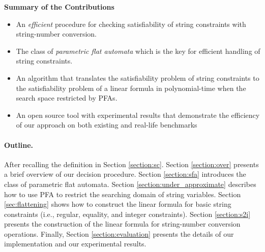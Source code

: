 \documentclass[sigplan,review,anonymous]{acmart}\settopmatter{printfolios=true,printccs=false,printacmref=false}
\begin{document}
\smallskip

\noindent
{\bf Summary of the Contributions}

\begin{itemize}

\item An {\em efficient} procedure for checking satisfiability
of string constraints with string-number conversion.



\item The class of \emph{parametric flat automata} which is the key for efficient handling of string constraints.

\item An algorithm that translates the satisfiability problem of string constraints to the satisfiability problem of a linear formula  in polynomial-time when  the search space restricted by PFAs.


\item An open source tool with experimental
results that demonstrate the efficiency of
our approach on both existing and real-life benchmarks
\end{itemize}


\paragraph{Outline.}
After recalling the  definition in Section \ref{section:sc}. Section \ref{section:over} presents a brief overview of our decision procedure. 
Section \ref{section:sfa} introduces  the class of parametric flat automata. 
Section \ref{section:under_approximate} describes how to use PFA to restrict the searching domain of string variables.
Section \ref{sec:flattening} shows how to construct the linear formula for  basic string constraints (i.e., 
regular, equality, and integer constraints). 
 Section \ref{section:s2i} presents the construction of the linear formula for string-number conversion operations. Finally, Section \ref{section:evaluation} presents the details of our implementation and our experimental results.
 
\end{document}
